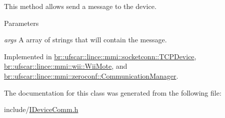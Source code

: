 This method allows send a message to the device. 


\begin{DoxyParams}{Parameters}
\item[{\em args}]A array of strings that will contain the message. \end{DoxyParams}


Implemented in \hyperlink{classbr_1_1ufscar_1_1lince_1_1mmi_1_1socketconn_1_1TCPDevice_a533e8c0d49d2418a244e46242dc70d99}{br::ufscar::lince::mmi::socketconn::TCPDevice}, \hyperlink{classbr_1_1ufscar_1_1lince_1_1mmi_1_1wii_1_1WiiMote_acd1fe851dd5909ee3cbd0fa23a070f0e}{br::ufscar::lince::mmi::wii::WiiMote}, and \hyperlink{classbr_1_1ufscar_1_1lince_1_1mmi_1_1zeroconf_1_1CommunicationManager_a40b30969966a6517d21cf9a1cf5c3da8}{br::ufscar::lince::mmi::zeroconf::CommunicationManager}.



The documentation for this class was generated from the following file:\begin{DoxyCompactItemize}
\item 
include/\hyperlink{IDeviceComm_8h}{IDeviceComm.h}\end{DoxyCompactItemize}
